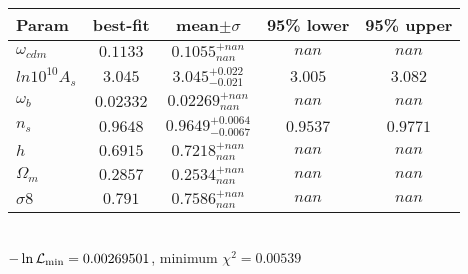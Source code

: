 \begin{tabular}{|l|c|c|c|c|} 
 \hline 
Param & best-fit & mean$\pm\sigma$ & 95\% lower & 95\% upper \\ \hline 
$\omega_{cdm }$ &$0.1133$ & $0.1055_{nan}^{+nan}$ & $nan$ & $nan$ \\ 
$ln10^{10}A_{s }$ &$3.045$ & $3.045_{-0.021}^{+0.022}$ & $3.005$ & $3.082$ \\ 
$\omega_{b }$ &$0.02332$ & $0.02269_{nan}^{+nan}$ & $nan$ & $nan$ \\ 
$n_{s }$ &$0.9648$ & $0.9649_{-0.0067}^{+0.0064}$ & $0.9537$ & $0.9771$ \\ 
$h$ &$0.6915$ & $0.7218_{nan}^{+nan}$ & $nan$ & $nan$ \\ 
$\Omega_{m }$ &$0.2857$ & $0.2534_{nan}^{+nan}$ & $nan$ & $nan$ \\ 
$\sigma8$ &$0.791$ & $0.7586_{nan}^{+nan}$ & $nan$ & $nan$ \\ 
\hline 
 \end{tabular} \\ 
$-\ln{\cal L}_\mathrm{min} =0.00269501$, minimum $\chi^2=0.00539$ \\ 
